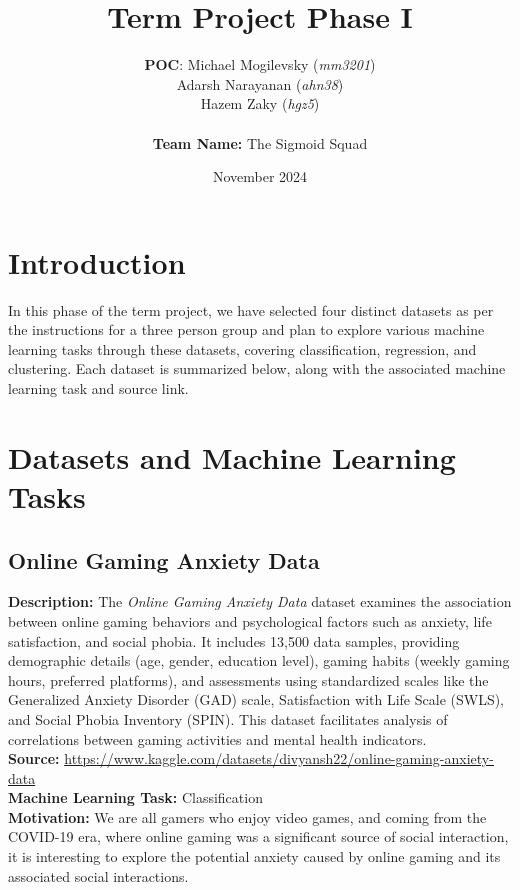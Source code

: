 \documentclass{article}
\title{Term Project Phase I}
\author{
    \textbf{POC}: Michael Mogilevsky (\textit{mm3201}) \\ 
    Adarsh Narayanan (\textit{ahn38}) \\
    Hazem Zaky (\textit{hgz5}) \\ \\
    \textbf{Team Name:} The Sigmoid Squad
}
\date{November 2024}
\begin{document}
\maketitle

\section{Introduction}

In this phase of the term project, we have selected four distinct datasets as per the instructions for a three person group and plan to explore various machine learning tasks through these datasets, covering classification, regression, and clustering. Each dataset is summarized below, along with the associated machine learning task and source link.

\section{Datasets and Machine Learning Tasks} 

\vspace{0.4cm}

\subsection{Online Gaming Anxiety Data}
\textbf{Description:} The \textit{Online Gaming Anxiety Data} dataset examines the association between online gaming behaviors and psychological factors such as anxiety, life satisfaction, and social phobia. It includes 13,500 data samples, providing demographic details (age, gender, education level), gaming habits (weekly gaming hours, preferred platforms), and assessments using standardized scales like the Generalized Anxiety Disorder (GAD) scale, Satisfaction with Life Scale (SWLS), and Social Phobia Inventory (SPIN). This dataset facilitates analysis of correlations between gaming activities and mental health indicators. \\

\textbf{Source:} \href{https://www.kaggle.com/datasets/divyansh22/online-gaming-anxiety-data}{https://www.kaggle.com/datasets/divyansh22/online-gaming-anxiety-data}\\

\textbf{Machine Learning Task:} Classification \\

\textbf{Motivation:} We are all gamers who enjoy video games, and coming from the COVID-19 era, where online gaming was a significant source of social interaction, it is interesting to explore the potential anxiety caused by online gaming and its associated social interactions. \\
\end{document}
